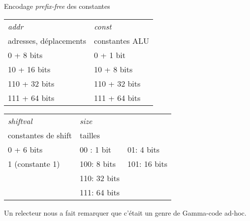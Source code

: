 \documentclass[slidetop,11pt,table]{beamer}
\begin{document}
\begin{frame}{Encodage \emph{prefix-free} des constantes}

  \begin{center}
    \begin{tabular}{|l||l|}
      \hline
      \emph{addr}&  \emph{const}  \\
      adresses, déplacements & constantes ALU    \\
      \hline
      0 + 8 bits               & 0 + 1 bit      \\ 
      10 + 16 bits             & 10 + 8 bits    \\
      110 + 32 bits            & 110 + 32 bits  \\
      111 + 64 bits            & 111 + 64 bits   \\
      \hline
    \end{tabular}
    
    \begin{tabular}{|l||ll|}
      \hline
      \emph{shiftval} & \emph{size}& \\
      constantes de shift & tailles     &              \\
      
      0 + 6 bits          & 00 : 1 bit &  01: 4 bits  \\ 
      1  (constante 1)    & 100: 8 bits& 101: 16 bits \\
                      & 110: 32 bits &            \\
                      & 111: 64 bits &             \\
      \hline
    \end{tabular}
  \end{center}
Un relecteur nous a fait remarquer que c'était un genre de Gamma-code ad-hoc.
\end{frame}
\end{document}
